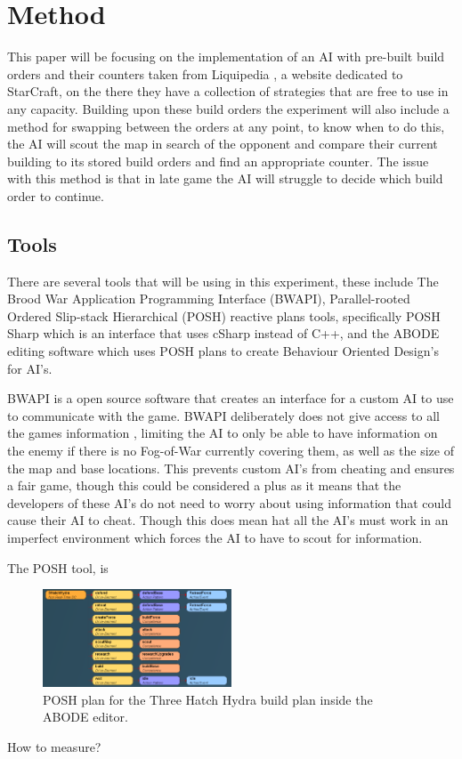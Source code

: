 \documentclass[journal]{IEEEtran}
\begin{document}
\section{Method}
This paper will be focusing on the implementation of an AI with pre-built build orders and their counters taken from Liquipedia \cite{Liquid}, a website dedicated to StarCraft, on the there they have a collection of strategies that are free to use in any capacity. Building upon these build orders the experiment will also include a method for swapping between the orders at any point, to know when to do this, the AI will scout the map in search of the opponent and compare their current building to its stored build orders and find an appropriate counter. The issue with this method is that in late game the AI will struggle to decide which build order to continue. 

\subsection{Tools}
There are several tools that will be using in this experiment, these include The Brood War Application Programming Interface (BWAPI), Parallel-rooted Ordered Slip-stack Hierarchical (POSH) reactive plans tools, specifically POSH Sharp which is an interface that uses cSharp instead of C++, and the ABODE editing software which uses POSH plans to create Behaviour Oriented Design's for AI's. 

BWAPI \cite{BWAPI} is a open source software that creates an interface for a custom AI to use to communicate with the game. BWAPI deliberately does not give access to all the games information \cite{POSH}, limiting the AI to only be able to have information on the enemy if there is no Fog-of-War currently covering them, as well as the size of the map and base locations. This prevents custom AI's from cheating and ensures a fair game, though this could be considered a plus as it means that the developers of these AI's do not need to worry about using information that could cause their AI to cheat. Though this does mean hat all the AI's must work in an imperfect environment which forces the AI to have to scout for information.

The POSH tool, is 

\begin{figure}[h]
	\centering
	\includegraphics[width=0.5\textwidth]{POSH}
	\caption{POSH plan for the Three Hatch Hydra build plan inside the ABODE editor.}
	\label{fig:mesh1}
\end{figure}
\newpage
How to measure?






\end{document}
